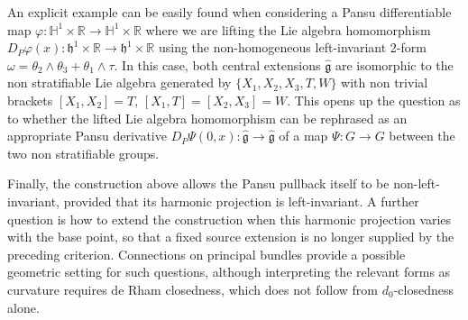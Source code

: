 \documentclass[dvipsnames]{amsart}
\theoremstyle{definition}
\theoremstyle{definition}
\numberwithin{equation}{section}
\newcommand{\R}{\mathbb{R}}
\begin{document}
An explicit example can be easily found when considering a Pansu differentiable map $\varphi\colon \mathbb H^1\times\R\to \mathbb H^1\times\R$ where we are lifting the Lie algebra homomorphism $D_P\varphi(x)\colon\mathfrak{h}^1\times\R\to\mathfrak{h}^1\times\R$ using the non-homogeneous left-invariant 2-form $\omega=\theta_2\wedge\theta_3+\theta_1\wedge\tau$.
In this case, both central extensions $\hat{\mathfrak{g}}$ are isomorphic to the non stratifiable Lie algebra generated by $\{X_1,X_2,X_3,T,W\}$ with non trivial brackets $[X_1,X_2]=T$, $[X_1,T]=[X_2,X_3]=W$. This opens up the question as to whether the lifted Lie algebra homomorphism can be rephrased as an appropriate Pansu derivative $D_P\Psi(0,x)\colon\hat{\mathfrak{g}}\to\hat{\mathfrak{g}}$ of a map $\Psi\colon G\to G$ between the two non stratifiable groups.

Finally, the construction above allows the Pansu pullback itself
to be non-left-invariant, provided that its harmonic
projection is left-invariant. A further question is how
to extend the construction when this harmonic projection
varies with the base point, so that a fixed source
extension is no longer supplied by the preceding
criterion. Connections on principal bundles provide a
possible geometric setting for such questions, although
interpreting the relevant forms as curvature requires
de Rham closedness, which does not follow from
$d_0$-closedness alone.

\bigskip


\end{document}
